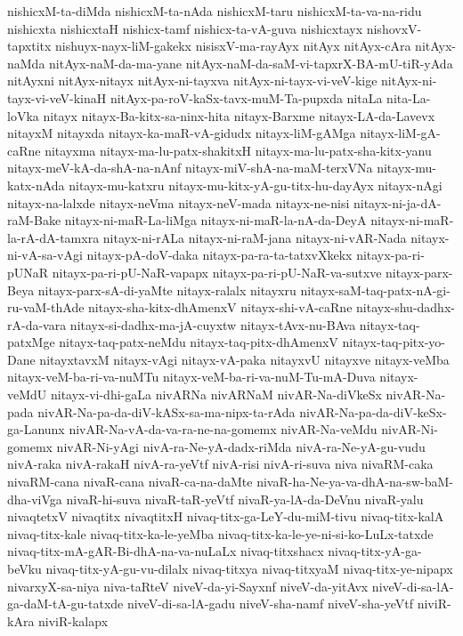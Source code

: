 {nishicxM-ta-diMda
nishicxM-ta-nAda
nishicxM-taru
nishicxM-ta-va-na-ridu
nishicxta
nishicxtaH
nishicx-tamf
nishicx-ta-vA-guva
nishicxtayx
nishovxV-tapxtitx
nishuyx-nayx-liM-gakekx
nisisxV-ma-rayAyx
nitAyx
nitAyx-cAra
nitAyx-naMda
nitAyx-naM-da-ma-yane
nitAyx-naM-da-saM-vi-tapxrX-BA-mU-tiR-yAda
nitAyxni
nitAyx-nitayx
nitAyx-ni-tayxva
nitAyx-ni-tayx-vi-veV-kige
nitAyx-ni-tayx-vi-veV-kinaH
nitAyx-pa-roV-kaSx-tavx-muM-Ta-pupxda
nitaLa
nita-La-loVka
nitayx
nitayx-Ba-kitx-sa-ninx-hita
nitayx-Barxme
nitayx-LA-da-Lavevx
nitayxM
nitayxda
nitayx-ka-maR-vA-gidudx
nitayx-liM-gAMga
nitayx-liM-gA-caRne
nitayxma
nitayx-ma-lu-patx-shakitxH
nitayx-ma-lu-patx-sha-kitx-yanu
nitayx-meV-kA-da-shA-na-nAnf
nitayx-miV-shA-na-maM-terxVNa
nitayx-mu-katx-nAda
nitayx-mu-katxru
nitayx-mu-kitx-yA-gu-titx-hu-dayAyx
nitayx-nAgi
nitayx-na-lalxde
nitayx-neVma
nitayx-neV-mada
nitayx-ne-nisi
nitayx-ni-ja-dA-raM-Bake
nitayx-ni-maR-La-liMga
nitayx-ni-maR-la-nA-da-DeyA
nitayx-ni-maR-la-rA-dA-tamxra
nitayx-ni-rALa
nitayx-ni-raM-jana
nitayx-ni-vAR-Nada
nitayx-ni-vA-sa-vAgi
nitayx-pA-doV-daka
nitayx-pa-ra-ta-tatxvXkekx
nitayx-pa-ri-pUNaR
nitayx-pa-ri-pU-NaR-vapapx
nitayx-pa-ri-pU-NaR-va-sutxve
nitayx-parx-Beya
nitayx-parx-sA-di-yaMte
nitayx-ralalx
nitayxru
nitayx-saM-taq-patx-nA-gi-ru-vaM-thAde
nitayx-sha-kitx-dhAmenxV
nitayx-shi-vA-caRne
nitayx-shu-dadhx-rA-da-vara
nitayx-si-dadhx-ma-jA-cuyxtw
nitayx-tAvx-nu-BAva
nitayx-taq-patxMge
nitayx-taq-patx-neMdu
nitayx-taq-pitx-dhAmenxV
nitayx-taq-pitx-yo-Dane
nitayxtavxM
nitayx-vAgi
nitayx-vA-paka
nitayxvU
nitayxve
nitayx-veMba
nitayx-veM-ba-ri-va-nuMTu
nitayx-veM-ba-ri-va-nuM-Tu-mA-Duva
nitayx-veMdU
nitayx-vi-dhi-gaLa
nivARNa
nivARNaM
nivAR-Na-diVkeSx
nivAR-Na-pada
nivAR-Na-pa-da-diV-kASx-sa-ma-nipx-ta-rAda
nivAR-Na-pa-da-diV-keSx-ga-Lanunx
nivAR-Na-vA-da-va-ra-ne-na-gomemx
nivAR-Na-veMdu
nivAR-Ni-gomemx
nivAR-Ni-yAgi
nivA-ra-Ne-yA-dadx-riMda
nivA-ra-Ne-yA-gu-vudu
nivA-raka
nivA-rakaH
nivA-ra-yeVtf
nivA-risi
nivA-ri-suva
niva
nivaRM-caka
nivaRM-cana
nivaR-cana
nivaR-ca-na-daMte
nivaR-ha-Ne-ya-va-dhA-na-sw-baM-dha-viVga
nivaR-hi-suva
nivaR-taR-yeVtf
nivaR-ya-lA-da-DeVnu
nivaR-yalu
nivaqtetxV
nivaqtitx
nivaqtitxH
nivaq-titx-ga-LeY-du-miM-tivu
nivaq-titx-kalA
nivaq-titx-kale
nivaq-titx-ka-le-yeMba
nivaq-titx-ka-le-ye-ni-si-ko-LuLx-tatxde
nivaq-titx-mA-gAR-Bi-dhA-na-va-nuLaLx
nivaq-titxshacx
nivaq-titx-yA-ga-beVku
nivaq-titx-yA-gu-vu-dilalx
nivaq-titxya
nivaq-titxyaM
nivaq-titx-ye-nipapx
nivarxyX-sa-niya
niva-taRteV
niveV-da-yi-Sayxnf
niveV-da-yitAvx
niveV-di-sa-lA-ga-daM-tA-gu-tatxde
niveV-di-sa-lA-gadu
niveV-sha-namf
niveV-sha-yeVtf
niviR-kAra
niviR-kalapx
}
